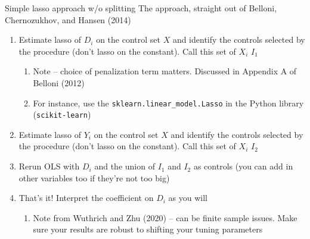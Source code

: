   \begin{frame}{Simple lasso approach w/o splitting}
    The approach, straight out of Belloni, Chernozukhov, and Hansen (2014)
    \begin{enumerate}
    \item Estimate lasso of $D_{i}$ on the control set $X$ and identify
      the controls selected by the procedure (don't lasso on the
      constant). Call this set of $X_{i}$ $I_{1}$
      \begin{enumerate}[-]
      \item Note -- choice of penalization term matters. Discussed in Appendix A of Belloni (2012)
      \item For instance, use the \texttt{sklearn.linear\_model.Lasso} in the Python library  (\texttt{scikit-learn})
      \end{enumerate}
    \item Estimate lasso of $Y_{i}$ on the control set $X$ and identify
      the controls selected by the procedure (don't lasso on the
      constant). Call this set of $X_{i}$ $I_{2}$ 
    \item Rerun OLS with $D_{i}$ and the union of $I_{1}$ and $I_{2}$ as
      controls (you can add in other variables too if they're not too
      big)
    \item That's it! Interpret the coefficient on $D_{i}$ as you will
      \begin{enumerate}[-]
      \item Note from Wuthrich and Zhu (2020) -- can be finite sample
        issues. Make sure your results are robust to shifting your
        tuning parameters
      \end{enumerate}
    \end{enumerate}
  \end{frame}
  
